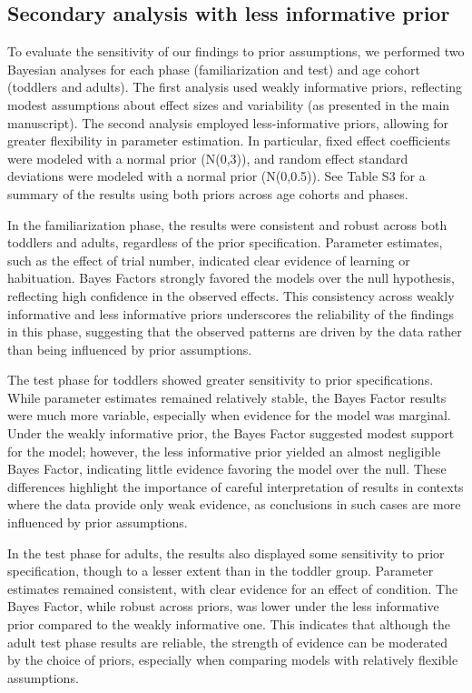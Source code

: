 \documentclass[
  man, donotrepeattitle,floatsintext]{apa6}
\begin{document}
\subsection{Secondary analysis with less informative prior}\label{secondary-analysis-with-less-informative-prior}

To evaluate the sensitivity of our findings to prior assumptions, we performed two Bayesian analyses for each phase (familiarization and test) and age cohort (toddlers and adults). The first analysis used weakly informative priors, reflecting modest assumptions about effect sizes and variability (as presented in the main manuscript). The second analysis employed less-informative priors, allowing for greater flexibility in parameter estimation. In particular, fixed effect coefficients were modeled with a normal prior (N(0,3)), and random effect standard deviations were modeled with a normal prior (N(0,0.5)). See Table S3 for a summary of the results using both priors across age cohorts and phases.

In the familiarization phase, the results were consistent and robust across both toddlers and adults, regardless of the prior specification. Parameter estimates, such as the effect of trial number, indicated clear evidence of learning or habituation. Bayes Factors strongly favored the models over the null hypothesis, reflecting high confidence in the observed effects. This consistency across weakly informative and less informative priors underscores the reliability of the findings in this phase, suggesting that the observed patterns are driven by the data rather than being influenced by prior assumptions.

The test phase for toddlers showed greater sensitivity to prior specifications. While parameter estimates remained relatively stable, the Bayes Factor results were much more variable, especially when evidence for the model was marginal. Under the weakly informative prior, the
Bayes Factor suggested modest support for the model; however, the less informative prior yielded an almost negligible Bayes Factor, indicating little evidence favoring the model over the null. These differences highlight the importance of careful interpretation of results in contexts where the data provide only weak evidence, as conclusions in such cases are more influenced by prior assumptions.

In the test phase for adults, the results also displayed some sensitivity to prior specification, though to a lesser extent than in the toddler group. Parameter estimates remained consistent, with clear evidence for an effect of condition. The Bayes Factor, while robust across priors, was lower under the less informative prior compared to the weakly informative one. This indicates that although the adult test phase results are reliable, the strength of evidence can be moderated by the choice of priors, especially when comparing models with relatively flexible assumptions.
\end{document}
